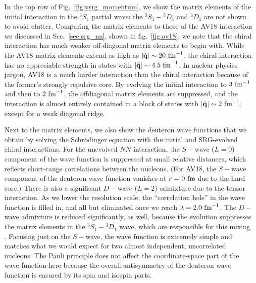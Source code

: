 {In the top row of Fig.~\ref{fig:vsrg_momentum}, we show the matrix elements
of the initial interaction in the ${}^3S_1$ partial wave; the ${}^3S_1-{}^3D_1$
and ${}^3D_1$ are not shown to avoid clutter. Comparing the matrix elements to
those of the AV18 interaction we discussed in Sec.~\ref{sec:srg_nn}, shown
in fig.~\ref{fig:av18}, we note that the chiral interaction has much weaker
off-diagonal matrix elements to begin with. While the AV18 matrix elements
extend as high as $|\hat{\mathbf{q}}|\sim 20\,\,\text{fm}^{-1}$, the chiral interaction has no appreciable
strength in states with $|\hat{\mathbf{q}}|\sim 4.5\,\,\text{fm}^{-1}$. In nuclear physics jargon, 
AV18 is a much harder interaction than the chiral interaction because of 
the former's strongly repulsive core. By evolving the initial interaction
to $3\,\,\text{fm}^{-1}$ and then to $2\,\,\text{fm}^{-1}$, the offdiagonal matrix elements are 
suppressed, and the interaction is almost entirely contained in a block
of states with $|\hat{\mathbf{q}}|\sim 2\,\,\text{fm}^{-1}$, except for a weak diagonal ridge.

Next to the matrix elements, we also show the deuteron wave functions
that we obtain by solving the Schr\"odinger equation with the initial
and SRG-evolved chiral interactions. For the unevolved $NN$ interaction,
the $S-$wave ($L=0$) component of the wave function is 
suppressed at small relative distances, which reflects short-range 
correlations between the nucleons. (For AV18, the $S-$wave component of 
the deuteron wave function vanishes at $r=0\,\,\text{fm}$ due to the hard core.)
There is also a significant $D-$wave ($L=2$) admixture due to the tensor interaction.
As we lower the resolution scale, the ``correlation hole'' in the wave
function is filled in, and all but eliminated once we reach 
$\lambda=2.0\,\,\text{fm}^{-1}$. The $D-$wave admixture is reduced significantly,
as well, because the evolution suppresses the 
matrix elements in the ${}^3S_1-{}^3D_1$ wave, which are responsible
for this mixing \cite{Bogner:2010pq}. Focusing just on the $S-$wave,
the wave function is extremely simple and matches what we would expect
for two almost independent, uncorrelated nucleons. The Pauli principle
does not affect the coordinate-space part of the wave function here 
because the overall antisymmetry of the deuteron wave function is ensured 
by its spin and isospin parts.

}
